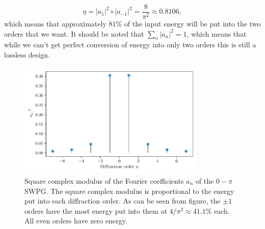 \begin{equation}
	\eta=\rvert a_1\rvert^2 + \rvert a_{-1}\rvert^2 =\frac{8}{\pi^2}\approx 0.8106,
\end{equation} 
which means that approximately $81\%$ of the input energy will be put into the two orders that we want.  It should be noted that $\sum_{n}\rvert a_n\rvert^2=1$, which means that while we can't get perfect conversion of energy into only two orders this is still a lossless design.
\begin{figure}
	\centering
	\includegraphics[width=0.8\textwidth]{figures/Two_source/a_n.pdf}
	\caption[Square modulus of Fourier coefficients of the $0-\pi$ SWPG]{Square complex modulus of the Fourier coefficients $a_n$ of the $0-\pi$ SWPG. The square complex modulus is proportional to the energy put into each diffraction order.  As can be seen from figure, the $\pm1$ orders have the most energy put into them at $4/\pi^2\approx41.1\%$ each.  All even orders have zero energy.}
	\label{fig:a_n}
\end{figure}

